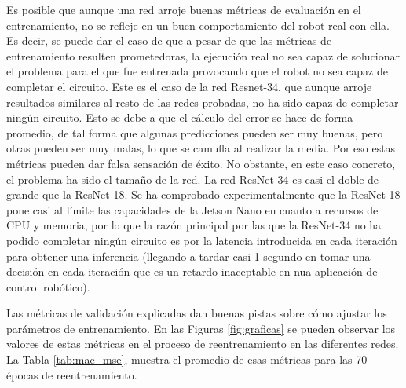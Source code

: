 Es posible que aunque una red arroje buenas métricas de evaluación en el entrenamiento, no se refleje en un buen comportamiento del robot real con ella. Es decir, se puede dar el caso de que a pesar de que las métricas de entrenamiento resulten prometedoras, la ejecución real no sea capaz de solucionar el problema para el que fue entrenada provocando que el robot no sea capaz de completar el circuito. Este es el caso de la red Resnet-34, que aunque arroje resultados similares al resto de las redes probadas, no ha sido capaz de completar ningún circuito. Esto se debe a que el cálculo del error se hace de forma promedio, de tal forma que algunas predicciones pueden ser muy buenas, pero otras pueden ser muy malas, lo que se camufla al realizar la media. Por eso estas métricas pueden dar falsa sensación de éxito. No obstante, en este caso concreto, el problema ha sido el tamaño de la red. La red ResNet-34 es casi el doble de grande que la ResNet-18. Se ha comprobado experimentalmente que la ResNet-18 pone casi al límite las capacidades de la Jetson Nano en cuanto a recursos de CPU y memoria, por lo que la razón principal por las que la ResNet-34 no ha podido completar ningún circuito es por la latencia introducida en cada iteración para obtener una inferencia (llegando a tardar casi 1 segundo en tomar una decisión en cada iteración que es un retardo inaceptable en nua aplicación de control robótico).

Las métricas de validación explicadas dan buenas pistas sobre cómo ajustar los parámetros de entrenamiento. En las Figuras \ref{fig:graficas} se pueden observar los valores de estas métricas en el proceso de reentrenamiento en las diferentes redes. La Tabla \ref{tab:mae_mse}, muestra el promedio de esas métricas para las 70 épocas de reentrenamiento.


